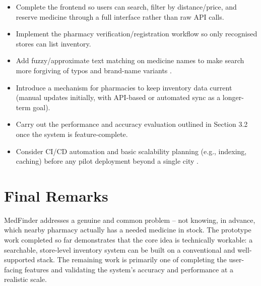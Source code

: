 \documentclass[11pt,a4paper]{report}
\begin{document}
\begin{itemize}
    \item Complete the frontend so users can search, filter by distance/price, and reserve medicine through a full interface rather than raw API calls.
    \item Implement the pharmacy verification/registration workflow so only recognised stores can list inventory.
    \item Add fuzzy/approximate text matching on medicine names to make search more forgiving of typos and brand-name variants \cite{ref2}.
    \item Introduce a mechanism for pharmacies to keep inventory data current (manual updates initially, with API-based or automated sync as a longer-term goal).
    \item Carry out the performance and accuracy evaluation outlined in Section 3.2 once the system is feature-complete.
    \item Consider CI/CD automation and basic scalability planning (e.g., indexing, caching) before any pilot deployment beyond a single city \cite{ref1}.
\end{itemize}

\section{Final Remarks}

MedFinder addresses a genuine and common problem -- not knowing, in advance, which nearby pharmacy actually has a needed medicine in stock. The prototype work completed so far demonstrates that the core idea is technically workable: a searchable, store-level inventory system can be built on a conventional and well-supported stack. The remaining work is primarily one of completing the user-facing features and validating the system's accuracy and performance at a realistic scale.
\end{document}
